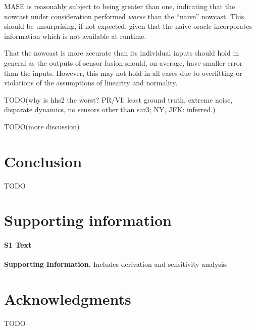 \documentclass[10pt,letterpaper]{article}
\begin{document}
MASE is reasonably subject to being greater than one, indicating that the
nowcast under consideration performed \textit{worse} than the ``naive''
nowcast. This should be unsurprising, if not expected, given that the naive
oracle incorporates information which is not available at runtime.

That the nowcast is more accurate than its individual inputs should hold in
general as the outputs of sensor fusion should, on average, have smaller error
than the inputs. However, this may not hold in all cases due to overfitting or
violations of the assumptions of linearity and normality.

TODO(why is hhs2 the worst? PR/VI: least ground truth, extreme noise, disparate
dynamics, no sensors other than sar3; NY, JFK: inferred.)

TODO(more discussion)

\section*{Conclusion}

TODO

\section*{Supporting information}

\paragraph*{S1 Text}
\label{S1_Text}
{\bf Supporting Information.} Includes derivation and sensitivity analysis.

\section*{Acknowledgments}

TODO

\nolinenumbers


%
\end{document}
